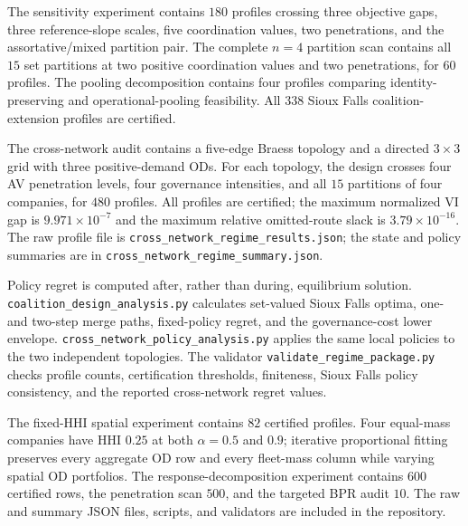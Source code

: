 The sensitivity experiment contains $180$ profiles crossing three objective gaps, three reference-slope scales, five coordination values, two penetrations, and the assortative/mixed partition pair. The complete $n=4$ partition scan contains all $15$ set partitions at two positive coordination values and two penetrations, for $60$ profiles. The pooling decomposition contains four profiles comparing identity-preserving and operational-pooling feasibility. All $338$ Sioux Falls coalition-extension profiles are certified.

The cross-network audit contains a five-edge Braess topology and a directed
$3\times3$ grid with three positive-demand ODs. For each topology, the design
crosses four AV penetration levels, four governance intensities, and all $15$
partitions of four companies, for $480$ profiles. All profiles are certified;
the maximum normalized VI gap is $9.971\times10^{-7}$ and the maximum relative
omitted-route slack is $3.79\times10^{-16}$. The raw profile file is
\texttt{cross\_network\_regime\_results.json}; the state and policy summaries
are in \texttt{cross\_network\_regime\_summary.json}.

Policy regret is computed after, rather than during, equilibrium solution.
\nolinkurl{coalition_design_analysis.py} calculates set-valued Sioux Falls
optima, one- and two-step merge paths, fixed-policy regret, and the
governance-cost lower envelope. \nolinkurl{cross_network_policy_analysis.py}
applies the same local policies to the two independent topologies. The
validator \nolinkurl{validate_regime_package.py} checks profile counts,
certification thresholds, finiteness, Sioux Falls policy consistency, and the
reported cross-network regret values.

The fixed-HHI spatial experiment contains $82$ certified profiles. Four equal-mass companies have HHI $0.25$ at both $\alpha=0.5$ and $0.9$; iterative proportional fitting preserves every aggregate OD row and every fleet-mass column while varying spatial OD portfolios. The response-decomposition experiment contains $600$ certified rows, the penetration scan $500$, and the targeted BPR audit $10$. The raw and summary JSON files, scripts, and validators are included in the repository.

